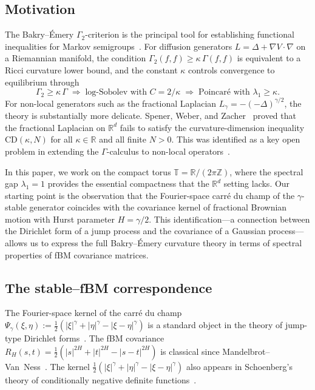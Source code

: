 \documentclass[11pt,a4paper]{article}
\theoremstyle{plain}
\theoremstyle{definition}
\theoremstyle{remark}
\newcommand{\R}{\mathbb{R}}
\newcommand{\Z}{\mathbb{Z}}
\newcommand{\T}{\mathbb{T}}
\begin{document}
\subsection{Motivation}

The Bakry--\'Emery $\Gamma_2$-criterion is the principal tool for
establishing functional inequalities for Markov
semigroups~\cite{BakryGentilLedoux2014}. For diffusion generators
$L = \Delta + \nabla V \cdot \nabla$ on a Riemannian manifold,
the condition $\Gamma_2(f,f) \geq \kappa\,\Gamma(f,f)$ is equivalent
to a Ricci curvature lower bound, and the constant $\kappa$ controls
convergence to equilibrium through
\[
  \Gamma_2 \geq \kappa\,\Gamma
  \;\Longrightarrow\;
  \text{log-Sobolev with } C = 2/\kappa
  \;\Longrightarrow\;
  \text{Poincar\'e with } \lambda_1 \geq \kappa.
\]
For non-local generators such as the fractional Laplacian
$L_\gamma = -(-\Delta)^{\gamma/2}$, the theory is substantially
more delicate. Spener, Weber, and
Zacher~\cite{SpenerWeberZacher2020} proved that the fractional
Laplacian on $\R^d$ fails to satisfy the curvature-dimension inequality
$\mathrm{CD}(\kappa,N)$ for all $\kappa \in \R$ and all finite $N > 0$.
This was identified as a key open problem in extending the $\Gamma$-calculus
to non-local operators~\cite{Garofalo2019}.

In this paper, we work on the compact torus $\T = \R/(2\pi\Z)$, where
the spectral gap $\lambda_1 = 1$ provides the essential compactness that
the $\R^d$ setting lacks.  Our starting point is the observation that
the Fourier-space carr\'e du champ of the $\gamma$-stable generator
coincides with the covariance kernel of fractional Brownian motion
with Hurst parameter $H = \gamma/2$.
This identification---a connection between the Dirichlet form of a
jump process and the covariance of a Gaussian process---allows us to
express the full Bakry--\'Emery curvature theory in terms of spectral
properties of fBM covariance matrices.


\subsection{The stable--fBM correspondence}

The Fourier-space kernel of the carr\'e du champ
$\Psi_\gamma(\xi,\eta) :=
\frac{1}{2}(|\xi|^\gamma + |\eta|^\gamma - |\xi-\eta|^\gamma)$
is a standard object in the theory of jump-type Dirichlet
forms~\cite{BoettcherSchillingWang2013}.
The fBM covariance $R_H(s,t) = \frac{1}{2}(|s|^{2H} + |t|^{2H}
- |s-t|^{2H})$ is classical since
Mandelbrot--Van~Ness~\cite{Mishura2008}.
The kernel $\frac{1}{2}(|\xi|^\gamma + |\eta|^\gamma
- |\xi-\eta|^\gamma)$ also appears in Schoenberg's
theory of conditionally negative definite
functions~\cite{Schoenberg1938}.
\end{document}
